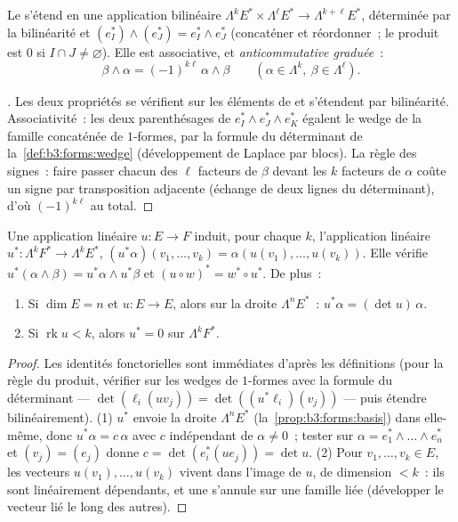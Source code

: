 \begin{definition}\label{def:b3:forms:wedgegeneral}
Le  s'étend en une application bilinéaire
$\Lambda^kE^* \times \Lambda^\ell E^* \to
\Lambda^{k+\ell}E^*$, déterminée par la bilinéarité et
$(e_I^*) \wedge (e_J^*) = e_I^* \wedge e_J^*$ (concaténer
et réordonner~; le produit est $0$ si $I \cap J \neq
\varnothing$). Elle est associative, et
\emph{anticommutative graduée}~:
\[
\beta \wedge \alpha = (-1)^{k\ell}\,\alpha \wedge \beta
\qquad (\alpha \in \Lambda^k, \ \beta \in \Lambda^\ell).
\]
\end{definition}

\begin{proof}[\omnameProof]
Les deux propriétés se vérifient sur les éléments de  et
s'étendent par bilinéarité. Associativité~: les deux
parenthésages de $e_I^* \wedge e_J^* \wedge e_K^*$ égalent
le wedge de la famille concaténée de $1$-formes, par la
formule du déterminant de la~\cref{def:b3:forms:wedge}
(développement de Laplace par blocs). La règle des signes~:
faire passer chacun des $\ell$ facteurs de $\beta$ devant les
$k$ facteurs de $\alpha$ coûte un signe par transposition
adjacente (échange de deux lignes du déterminant), d'où
$(-1)^{k\ell}$ au total.
\end{proof}

\begin{proposition}
\label{prop:b3:forms:linearpullback}
Une application linéaire $u\colon E \to F$ induit, pour
chaque $k$, l'application linéaire $u^*\colon \Lambda^kF^*
\to \Lambda^kE^*$, $(u^*\alpha)(v_1, \dots, v_k) =
\alpha(u(v_1), \dots, u(v_k))$. Elle vérifie $u^*(\alpha
\wedge \beta) = u^*\alpha \wedge u^*\beta$ et $(u \circ w)^*
= w^* \circ u^*$. De plus~:
\begin{enumerate}
  \item Si $\dim E = n$ et $u\colon E \to E$, alors sur la
        droite $\Lambda^nE^*$~: $u^*\alpha = (\det u)\,\alpha$.
  \item Si $\operatorname{rk}u < k$, alors $u^* = 0$ sur
        $\Lambda^kF^*$.
\end{enumerate}
\end{proposition}

\begin{proof}
Les identités fonctorielles sont immédiates d'après les
définitions (pour la règle du produit, vérifier sur les wedges
de $1$-formes avec la formule du déterminant ---
$\det(\ell_i(uv_j)) = \det((u^*\ell_i)(v_j))$ --- puis
étendre bilinéairement).
(1) $u^*$ envoie la droite $\Lambda^nE^*$
(la~\cref{prop:b3:forms:basis}) dans elle-même, donc $u^*\alpha
= c\,\alpha$ avec $c$ indépendant de $\alpha \neq 0$~; tester
sur $\alpha = e_1^* \wedge \dots \wedge e_n^*$ et $(v_j) =
(e_j)$ donne $c = \det(e_i^*(ue_j)) = \det u$.
(2) Pour $v_1, \dots, v_k \in E$, les vecteurs $u(v_1),
\dots, u(v_k)$ vivent dans l'image de $u$, de dimension $<
k$~: ils sont linéairement dépendants, et une 
s'annule sur une famille liée (développer le vecteur lié le
long des autres).
\end{proof}

